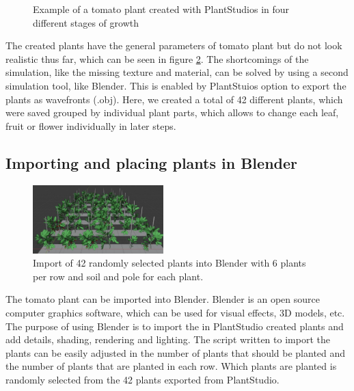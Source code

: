 \begin{figure}[h]
\begin{subfigure}{.24\textwidth}
		\label{fig:sub4}
	\end{subfigure}%
	\caption{Example of a tomato plant created with PlantStudios in four different stages of growth}
	\label{fig:plantStudio}
	\vspace{-10pt}
\end{figure} 


The created plants have the general parameters of tomato plant but do not look realistic thus far, which can be seen in figure \ref{fig:plantStudio}. The shortcomings of the simulation, like the missing texture and material, can be solved by using a second simulation tool, like Blender. This is enabled by PlantStuios option to export the plants as wavefronts (.obj). Here, we created a total of 42 different plants, which were saved grouped by individual plant parts, which allows to change each leaf, fruit or flower individually in later steps.



\subsection{Importing and placing plants in Blender}
\begin{figure} 
	\vspace{-25pt}
	\begin{center}
		\includegraphics[width=0.45\textwidth]{carla/figures/BlenderImport.JPG}
		\caption{Import of 42 randomly selected plants into Blender with 6 plants per row and soil and pole for each plant.}
		\label{fig:BlenderImport}
	\end{center}
	\vspace{-20pt}
	\vspace{1pt}
\end{figure} 

The tomato plant can be imported into Blender. Blender is an open source computer graphics software, which can be used for visual effects, 3D models, etc. The purpose of using Blender is to import the in PlantStudio created plants and  add details, shading, rendering and lighting. The script written to import the plants can be easily adjusted in the number of plants that should be planted and the number of plants that are planted in each row. Which plants are planted is randomly selected from the 42 plants exported from PlantStudio.

